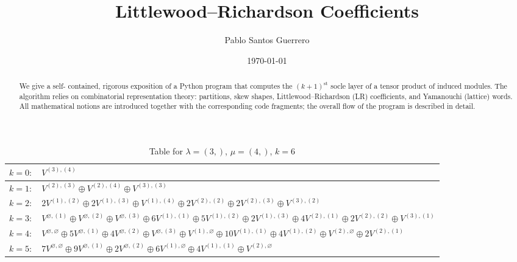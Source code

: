 \documentclass[a4paper,12pt]{article}
\title{Littlewood--Richardson Coefficients}
\author{Pablo Santos Guerrero}
\date{\today}
\begin{document}
\maketitle
\begin{abstract}
We give a self- contained, rigorous exposition of a Python program that computes the
\((k\!+\!1)^{\text{st}}\) socle layer of a tensor product of induced modules.
The algorithm relies on combinatorial representation theory:
partitions, skew shapes, Littlewood--Richardson (LR) coefficients, and
Yamanouchi (lattice) words.  
All mathematical notions are introduced together with the corresponding
code fragments; the overall flow of the program is described in detail.
\end{abstract}

\tableofcontents
\newpage
\renewcommand{\arraystretch}{1.6} 
\begin{table}[H]
\centering
\caption{Table for $\lambda = (3,)$, $\mu = (4,)$, $k = 6$}
\begin{tabular}{|>{\centering\arraybackslash}p{15cm}|}
\hline
 $k = 0: \quad V^{(3), (4)} $ \\ \hline
 $k = 1: \quad V^{(2), (3)} \oplus V^{(2), (4)} \oplus V^{(3), (3)} $ \\ \hline
 $k = 2: \quad 2 V^{(1), (2)} \oplus 2 V^{(1), (3)} \oplus V^{(1), (4)} \oplus 2 V^{(2), (2)} \oplus 2 V^{(2), (3)} \oplus V^{(3), (2)} $ \\ \hline
 $k = 3: \quad V^{\varnothing, (1)} \oplus V^{\varnothing, (2)} \oplus V^{\varnothing, (3)} \oplus 6 V^{(1), (1)} \oplus 5 V^{(1), (2)} \oplus 2 V^{(1), (3)} \oplus 4 V^{(2), (1)} \oplus 2 V^{(2), (2)} \oplus V^{(3), (1)} $ \\ \hline
 $k = 4: \quad V^{\varnothing, \varnothing} \oplus 5 V^{\varnothing, (1)} \oplus 4 V^{\varnothing, (2)} \oplus V^{\varnothing, (3)} \oplus V^{(1), \varnothing} \oplus 10 V^{(1), (1)} \oplus 4 V^{(1), (2)} \oplus V^{(2), \varnothing} \oplus 2 V^{(2), (1)} $ \\ \hline
 $k = 5: \quad 7 V^{\varnothing, \varnothing} \oplus 9 V^{\varnothing, (1)} \oplus 2 V^{\varnothing, (2)} \oplus 6 V^{(1), \varnothing} \oplus 4 V^{(1), (1)} \oplus V^{(2), \varnothing} $ \\ \hline
\end{tabular}
\end{table}
\end{document}
